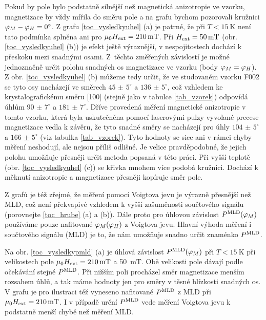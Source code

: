 Pokud by pole bylo podstatně silnější než magnetická anizotropie ve vzorku, magnetizace by vždy mířila do směru pole a na grafu bychom pozorovali kružnici $\varphi_M-\varphi_H=\ang{0}$. Z grafu \ref{toc_vysledkyuhel} (a) je patrné, že při $T<\SI{15}{\kelvin}$ není tato podmínka splněna ani pro $\mu_0H_\text{ext}=\SI{210}{\milli\tesla}$. Při $H_\text{ext}=\SI{50}{\milli\tesla}$ (obr. \ref{toc_vysledkyuhel} (b)) je efekt ještě výraznější, v nespojitostech dochází k přeskoku mezi snadnými osami. Z~těchto změřených závislostí je možné jednoznačně určit polohu snadných os magnetizace ve vzorku (body $\varphi_M=\varphi_H$). Z obr. \ref{toc_vysledkyuhel} (b) můžeme tedy určit, že ve studovaném vzorku F002 se tyto osy nacházejí ve směrech $\num{45(5)}^\circ$ a $\num{136(5)}^\circ$, což vzhledem ke krystalografickému směru [100] (stejně jako v tabulce \ref{tab_vzorek}) odpovídá úhlům $\num{90(7)}^\circ$ a $\num{181(7)}^\circ$. Dříve provedená měření magnetické anizotropie v tomto vzorku, která byla uskutečněna pomocí laserovými pulzy vyvolané precese magnetizace \cite{TesarovaDisertace} vedla k závěru, že tyto snadné směry se nacházejí pro úhly $\num{104(5)}^\circ$ a $\num{166(5)}^\circ$ (viz tabulka \ref{tab_vzorek}). Tyto hodnoty se sice ani v rámci chyby měření neshodují, ale nejsou příliš odlišné. Je velice pravděpodobné, že jejich polohu umožňuje přesněji určit metoda popsaná v této práci.
Při vyšší teplotě (obr. \ref{toc_vysledkyuhel} (c)) se křivka mnohem více podobá kružnici. Dochází k měknutí anizotropie a magnetizace přesněji kopíruje směr pole.

Z grafů je též zřejmé, že měření pomocí Voigtova jevu je výrazně přesnější než MLD, což není překvapivé vzhledem k vyšší zašuměnosti součtového signálu (porovnejte \ref{toc_hrube} (a) a (b)).
Dále proto pro úhlovou závislost $P^{\text{MLD}}(\varphi_M)$ používáme pouze nafitované $\varphi_M(\varphi_H)$ z Voigtova jevu.
Hlavní výhoda měření i součtového signálu (MLD) je to, že nám umožňuje snadno určit znaménko $P^{\text{MLD}}$.

Na obr. \ref{toc_vysledkypmld} (a) je úhlová závislost $P^{\text{MLD}}(\varphi_M)$ při $T<\SI{15}{\kelvin}$ při velikostech pole $\mu_0H_\text{ext}=\SI{210}{\milli\tesla}$ a \SI{50}{\milli\tesla}. Obě velikosti pole dávají podle očekávání stejné $P^{\text{MLD}}$. Při nižším poli procházel směr magnetizace menším rozsahem úhlů, a tak máme hodnoty jen pro směry v těsné blízkosti snadných os. V grafu je pro ilustraci též vyneseno nafitované $P^{\text{MLD}}$ z MLD při $\mu_0H_\text{ext}=\SI{210}{\milli\tesla}$. I v případě urční $P^{\text{MLD}}$ vede měření Voigtova jevu k podstatně menší chybě než měření MLD.


